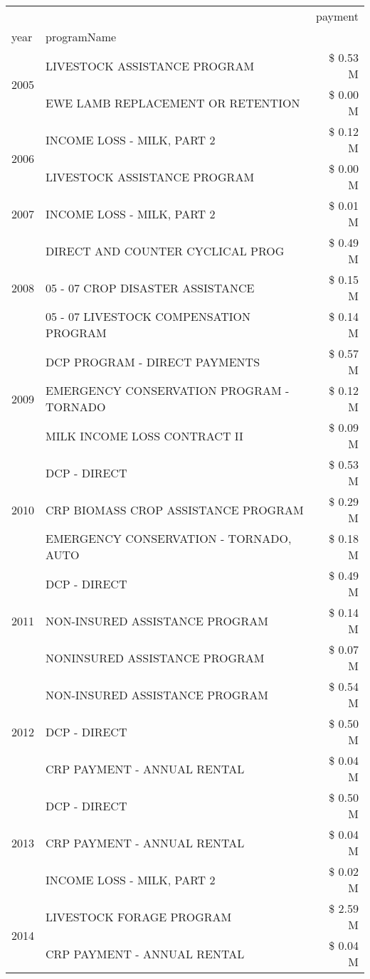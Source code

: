 \begin{tabular}{llr}
\toprule
 &  & payment \\
year & programName &  \\
\midrule
\multirow[t]{2}{*}{2005} & LIVESTOCK ASSISTANCE PROGRAM & \$ 0.53 M \\
 & EWE LAMB REPLACEMENT OR RETENTION & \$ 0.00 M \\
\cline{1-3}
\multirow[t]{2}{*}{2006} & INCOME LOSS - MILK, PART 2 & \$ 0.12 M \\
 & LIVESTOCK ASSISTANCE PROGRAM & \$ 0.00 M \\
\cline{1-3}
2007 & INCOME LOSS - MILK, PART 2 & \$ 0.01 M \\
\cline{1-3}
\multirow[t]{3}{*}{2008} & DIRECT AND COUNTER CYCLICAL PROG & \$ 0.49 M \\
 & 05 - 07 CROP DISASTER ASSISTANCE & \$ 0.15 M \\
 & 05 - 07 LIVESTOCK COMPENSATION PROGRAM & \$ 0.14 M \\
\cline{1-3}
\multirow[t]{3}{*}{2009} & DCP PROGRAM - DIRECT PAYMENTS & \$ 0.57 M \\
 & EMERGENCY CONSERVATION PROGRAM - TORNADO & \$ 0.12 M \\
 & MILK INCOME LOSS CONTRACT II & \$ 0.09 M \\
\cline{1-3}
\multirow[t]{3}{*}{2010} & DCP - DIRECT & \$ 0.53 M \\
 & CRP BIOMASS CROP ASSISTANCE PROGRAM & \$ 0.29 M \\
 & EMERGENCY CONSERVATION - TORNADO, AUTO & \$ 0.18 M \\
\cline{1-3}
\multirow[t]{3}{*}{2011} & DCP - DIRECT & \$ 0.49 M \\
 & NON-INSURED ASSISTANCE PROGRAM & \$ 0.14 M \\
 & NONINSURED ASSISTANCE PROGRAM & \$ 0.07 M \\
\cline{1-3}
\multirow[t]{3}{*}{2012} & NON-INSURED ASSISTANCE PROGRAM & \$ 0.54 M \\
 & DCP - DIRECT & \$ 0.50 M \\
 & CRP PAYMENT - ANNUAL RENTAL & \$ 0.04 M \\
\cline{1-3}
\multirow[t]{3}{*}{2013} & DCP - DIRECT & \$ 0.50 M \\
 & CRP PAYMENT - ANNUAL RENTAL & \$ 0.04 M \\
 & INCOME LOSS - MILK, PART 2 & \$ 0.02 M \\
\cline{1-3}
\multirow[t]{3}{*}{2014} & LIVESTOCK FORAGE PROGRAM & \$ 2.59 M \\
 & CRP PAYMENT - ANNUAL RENTAL & \$ 0.04 M \\

\end{tabular}
